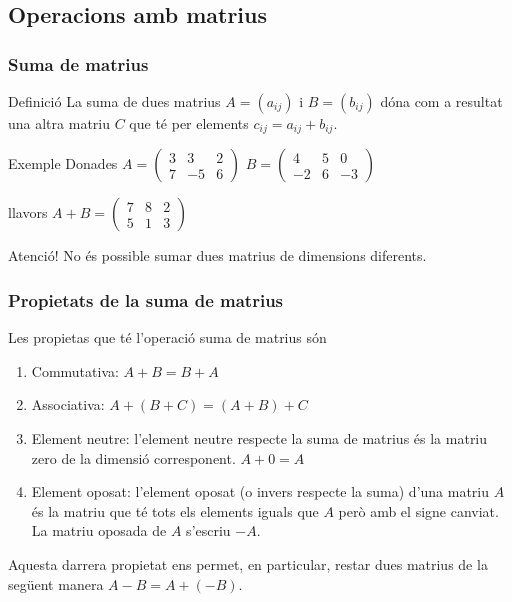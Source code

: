 \documentclass{beamer}
\begin{document}
\subsection{Operacions amb matrius}
\begin{frame}\frametitle{Suma de matrius}
\begin{block}{Definició}
La suma de dues matrius $A=(a_{ij})$ i $B=(b_{ij})$ dóna com a resultat una altra matriu $C$ que té per elements $c_{ij}=a_{ij}+b_{ij}$.
\end{block}
\begin{exampleblock}{Exemple}
Donades $A=\left(\begin{array}{ccc}
3 & 3 & 2\\
7 & -5 & 6\end{array}\right)$ $B=\left(\begin{array}{ccc}
4 & 5 & 0\\
-2 & 6 & -3\end{array}\right)$

llavors $A+B=\left(\begin{array}{ccc}
7 & 8 & 2\\
5 & 1 & 3\end{array}\right)$
\end{exampleblock}
\begin{alertblock}{Atenció!}
No és possible sumar dues matrius de dimensions diferents.
\end{alertblock}
\end{frame}
\begin{frame}\frametitle{Propietats de la suma de matrius}
Les propietas que té l'operació suma de matrius són
\begin{enumerate}
\item
Commutativa: $A+B=B+A$
\item
Associativa: $A+(B+C)=(A+B)+C$
\item
Element neutre: l'element neutre respecte la suma de matrius és la matriu zero de la dimensió corresponent. $A+0=A$
\item
Element oposat: l'element oposat (o invers respecte la suma) d'una matriu $A$ és la matriu que té tots els elements iguals que $A$ però amb el signe canviat. La matriu oposada de $A$ s'escriu $-A$.
\end{enumerate}
Aquesta darrera propietat ens permet, en particular, restar dues matrius de la següent manera $A-B=A+(-B)$.
\end{frame}
\end{document}
